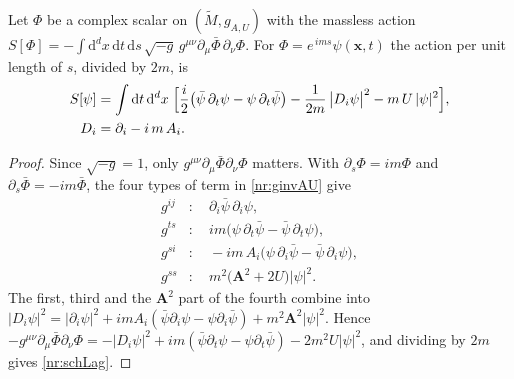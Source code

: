 \begin{nrprop}\label{nr:prop-reducedaction}
Let $\Phi$ be a complex scalar on $(\tilde M,g_{A,U})$ with the massless action
$S[\Phi]=-\int\mathrm{d}^dx\,\mathrm{d}t\,\mathrm{d}s\,\sqrt{-g}\,g^{\mu\nu}\partial_\mu\bar\Phi\,\partial_\nu\Phi$.
For $\Phi=e^{\,ims}\psi(\mathbf{x},t)$ the action per unit length of $s$, divided by $2m$, is
\begin{equation}
  \begin{aligned}
  S[\psi]&=\int\mathrm{d}t\,\mathrm{d}^dx\;\Bigl[
  \frac{i}{2}\bigl(\bar\psi\,\partial_t\psi-\psi\,\partial_t\bar\psi\bigr)
  -\frac{1}{2m}\,\bigl|D_i\psi\bigr|^2-m\,U\,|\psi|^2\Bigr],\\
  D_i&=\partial_i-i\,m\,A_i .
  \end{aligned}
  \label{nr:schLag}
\end{equation}
\end{nrprop}
\begin{proof}
Since $\sqrt{-g}=1$, only $g^{\mu\nu}\partial_\mu\bar\Phi\partial_\nu\Phi$ matters. With $\partial_s\Phi=im\Phi$
and $\partial_s\bar\Phi=-im\bar\Phi$, the four types of term in \eqref{nr:ginvAU} give
\begin{align*}
  g^{ij}&:\quad \partial_i\bar\psi\,\partial_i\psi,\\
  g^{ts}&:\quad im\bigl(\psi\,\partial_t\bar\psi-\bar\psi\,\partial_t\psi\bigr),\\
  g^{si}&:\quad -im\,A_i\bigl(\psi\,\partial_i\bar\psi-\bar\psi\,\partial_i\psi\bigr),\\
  g^{ss}&:\quad m^2\bigl(\mathbf{A}^2+2U\bigr)|\psi|^2 .
\end{align*}
The first, third and the $\mathbf{A}^2$ part of the fourth combine into
$|D_i\psi|^2=|\partial_i\psi|^2+imA_i(\bar\psi\partial_i\psi-\psi\partial_i\bar\psi)+m^2\mathbf{A}^2|\psi|^2$.
Hence $-g^{\mu\nu}\partial_\mu\bar\Phi\partial_\nu\Phi=-|D_i\psi|^2+im(\bar\psi\partial_t\psi-\psi\partial_t\bar\psi)-2m^2U|\psi|^2$,
and dividing by $2m$ gives \eqref{nr:schLag}.
\end{proof}

